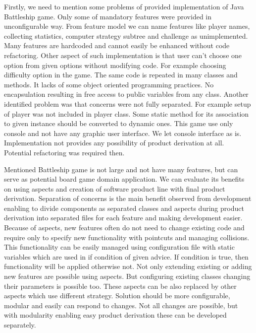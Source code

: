 \documentclass[11pt,english,a4paper,twoside]{article}
\begin{document}
Firstly, we need to mention some problems of provided implementation of Java Battleship game. Only some of mandatory features were provided in unconfigurable way. From feature model we can name features like player names, collecting statistics, computer strategy subtree and challenge as unimplemented. Many features are hardcoded and cannot easily be enhanced without code refactoring. Other aspect of such implementation is that user can't choose one option from given options without modifying code. For example choosing difficulty option in the game. The same code is repeated in many classes and methods. It lacks of some object oriented programming practices. No encapsulation resulting in free access to public variables from any class. Another identified problem was that concerns were not fully separated. For example setup of player was not included in player class. Some static method for its association to given instance should be converted to dynamic ones. This game use only console and not have any graphic user interface. We let console interface as is. Implementation not provides any possibility of product derivation at all. Potential refactoring was required then. 

Mentioned Battleship game is not large and not have many features, but can serve as potential board game domain application. We can evaluate its benefits on using aspects and creation of software product line with final product derivation. Separation of concerns is the main benefit observed from development enabling to divide components as separated classes and aspects during product derivation into separated files for each feature and making development easier. Because of aspects, new features often do not need to change existing code and require only to specify new functionality with pointcuts and managing collisions. This functionality can be easily managed using configuration file with static variables which are used in if condition of given advice. If condition is true, then functionality will be applied otherwise not. Not only extending existing or adding new features are possible using aspects. But configuring existing classes changing their parameters is possible too. These aspects can be also replaced by other aspects which use different strategy. Solution should be more configurable, modular and easily can respond to changes. Not all changes are possible, but with modularity enabling easy product derivation these can be developed separately.
\end{document}
